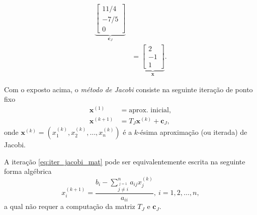 \begin{ex}
\begin{align}
      \underbrace{\begin{bmatrix}
       11/4 \\
       -7/5 \\
       0
      \end{bmatrix}}_{\pmb{c}_J}\\
  &= \underbrace{\begin{bmatrix}
        2 \\
        -1 \\
        1             
      \end{bmatrix}}_{\pmb{x}}.
  \end{align}
% 
\end{ex}

Com o exposto acima, o \emph{método de Jacobi} consiste na seguinte iteração de ponto fixo
\begin{align}
  \pmb{x}^{(1)} &= \text{aprox. inicial},\\
  \pmb{x}^{(k+1)} &= T_J\pmb{x}^{(k)} + \pmb{c}_J,\label{eq:iter_jacobi_mat}
\end{align}
onde $\pmb{x}^{(k)} = (x_1^{(k)}, x_2^{(k)}, \dotsc, x_n^{(k)})$ é a $k$-ésima aproximação (ou iterada) de Jacobi.

A iteração \eqref{eq:iter_jacobi_mat} pode ser equivalentemente escrita na seguinte forma algébrica
\begin{equation}
  x_i^{(k+1)} = \frac{{\displaystyle b_i - \sum_{\overset{j=1}{j\neq i}}^n a_{ij}x_j^{(k)}}}{a_{ii}},~i=1, 2, \dotsc, n,
\end{equation}
a qual não requer a computação da matriz $T_J$ e $\pmb{c}_J$.

